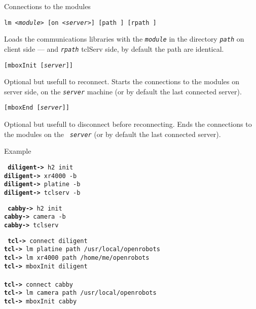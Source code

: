 \documentclass[a4paper,landscape,smooth]{show}
\begin{document}

\begin{tslide}{Connections to the modules}
   \vfill
   \begin{cartouche}
   \texttt{lm {\em <module>} [on {\em <server>}] [path {\em<path-on-tclsh-host-machine>}] [rpath {\em <path-on-tclserv-target-machine>}]}
   \end{cartouche}   
   Loads the communications libraries with the \texttt{\em module}
   in the directory \texttt{\em path} on client side --- and
   \texttt{\em rpath} tclServ side, by default the path are identical.
   \vfill
   \begin{cartouche}
   \texttt{[mboxInit [{\em server}]]}
   \end{cartouche}   
    Optional but usefull to reconnect. Starts the connections to the modules on server side, on the 
   \texttt{\em server} machine (or by default the last connected server).
   \vfill
   \begin{cartouche}
   \texttt{[mboxEnd [{\em server}]]}
   \end{cartouche}   
   Optional but usefull to disconnect before reconnecting. Ends the connections to the modules on the \texttt{\em
   server} (or by 
   default the last connected server).
   \vfill
\end{tslide}


\begin{tslide}{Example}
   \vfill
   \parbox{0.45\linewidth}{\tt
      {\bf diligent->} h2 init\\
      {\bf diligent->} xr4000 -b\\
      {\bf diligent->} platine -b\\
      {\bf diligent->} tclserv -b\\
   }\hfill\parbox{0.45\linewidth}{\tt
      {\bf cabby->} h2 init\\
      {\bf cabby->} camera -b\\
      {\bf cabby->} tclserv\\
   }
   \vfill
   {\tt
      {\bf tcl->} connect diligent\\
      {\bf tcl->} lm platine path /usr/local/openrobots\\
      {\bf tcl->} lm xr4000 path /home/me/openrobots\\
      {\bf tcl->} mboxInit diligent\\
\\
      {\bf tcl->} connect cabby\\
      {\bf tcl->} lm camera path /usr/local/openrobots\\
      {\bf tcl->} mboxInit cabby\\
   }
   \vfill
\end{tslide}
\end{document}
